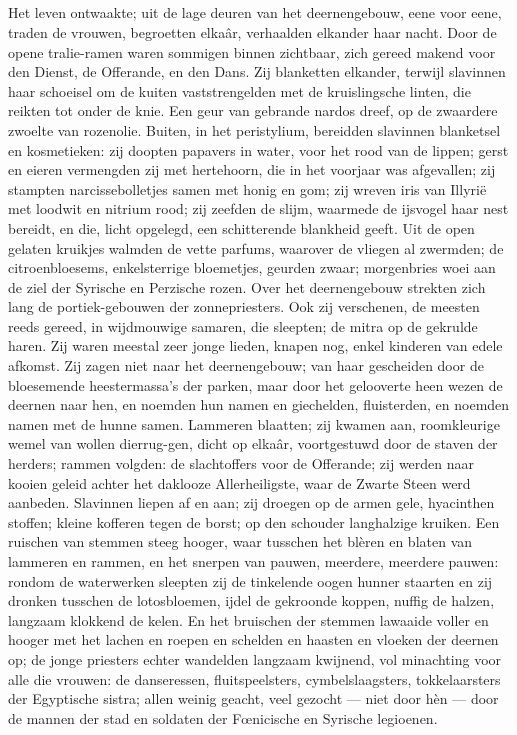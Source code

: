 \documentclass[a4paper, 12pt, oneside, dutch]{article}
\begin{document}
\subsection{}
\paragraph{}
Het leven ontwaakte; uit de lage deuren van het deernengebouw, eene voor eene, traden de vrouwen, begroetten elkaâr, verhaalden elkander haar nacht. Door de opene tralie-ramen waren sommigen binnen zichtbaar, zich gereed makend voor den Dienst, de Offerande, en den Dans. Zij blanketten elkander, terwijl slavinnen haar schoeisel om de kuiten vaststrengelden met de kruislingsche linten, die reikten tot onder de knie. Een geur van gebrande nardos dreef, op de zwaardere zwoelte van rozenolie. Buiten, in het peristylium, bereidden slavinnen blanketsel en kosmetieken: zij doopten papavers in water, voor het rood van de lippen; gerst en eieren vermengden zij met hertehoorn, die in het voorjaar was afgevallen; zij stampten narcissebolletjes samen met honig en gom; zij wreven iris van Illyrië met loodwit en nitrium rood; zij zeefden de slijm, waarmede de ijsvogel haar nest bereidt, en die, licht opgelegd, een schitterende blankheid geeft. Uit de open gelaten kruikjes walmden de vette parfums, waarover de vliegen al zwermden; de citroenbloesems, enkelsterrige bloemetjes, geurden zwaar; morgenbries woei aan de ziel der Syrische en Perzische rozen. Over het deernengebouw strekten zich lang de portiek-gebouwen der zonnepriesters. Ook zij verschenen, de meesten reeds gereed, in wijdmouwige samaren, die sleepten; de mitra op de gekrulde haren. Zij waren meestal zeer jonge lieden, knapen nog, enkel kinderen van edele afkomst. Zij zagen niet naar het deernengebouw; van haar gescheiden door de bloesemende heestermassa's der parken, maar door het gelooverte heen wezen de deernen naar hen, en noemden hun namen en giechelden, fluisterden, en noemden namen met de hunne samen. Lammeren blaatten; zij kwamen aan, roomkleurige wemel van wollen dierrug-gen, dicht op elkaâr, voortgestuwd door de staven der herders; rammen volgden: de slachtoffers voor de Offerande; zij werden naar kooien geleid achter het daklooze Allerheiligste, waar de Zwarte Steen werd aanbeden. Slavinnen liepen af en aan; zij droegen op de armen gele, hyacinthen stoffen; kleine kofferen tegen de borst; op den schouder langhalzige kruiken. Een ruischen van stemmen steeg hooger, waar tusschen het blèren en blaten van lammeren en rammen, en het snerpen van pauwen, meerdere, meerdere pauwen: rondom de waterwerken sleepten zij de tinkelende oogen hunner staarten en zij dronken tusschen de lotosbloemen, ijdel de gekroonde koppen, nuffig de halzen, langzaam klokkend de kelen. En het bruischen der stemmen lawaaide voller en hooger met het lachen en roepen en schelden en haasten en vloeken der deernen op; de jonge priesters echter wandelden langzaam kwijnend, vol minachting voor alle die vrouwen: de danseressen, fluitspeelsters, cymbelslaagsters, tokkelaarsters der Egyptische sistra; allen weinig geacht, veel gezocht --- niet door hèn --- door de mannen der stad en soldaten der Fœnicische en Syrische legioenen.
\end{document}

